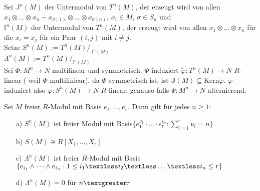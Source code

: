  \begin{Bew}
  Sei $\mathbb{J}^n(M)$ der Untermodul von $T^n(M)$, der erzeugt wird von allen 
  \\$x_1 \otimes \dots \otimes x_n -x_{\sigma(1)} \otimes \dots \otimes x_{\sigma(n)}$, $x_i \in M$, $ \sigma \in S_n$ und \\
  $\mathbb{I}^n(M)$ der Untermodul von $T^n(M)$, der erzeugt wird von allen
  $x_1 \otimes \dots \otimes x_n$ für die $x_i = x_j$ für ein Paar $(i,j)$ mit $i \neq j$.\\
  Setze $S^n(M) := T^n(M) /_{\mathbb{J}^n(M)}$\\
  $\Lambda^n(M) := T^n(M) /_{\mathbb{I}^n(M)}$ \\
  Sei $\Phi: M^n \rightarrow N$ multilinear und symmetrisch. $\Phi$ induziert 
  $\tilde{\varphi}:T^n(M) \rightarrow N$ $R$-linear ( weil $\Phi$ multiliniear), da $\Phi$ symmetrisch ist, ist
  $\mathbb{J}(M) \subseteq \textrm{Kern}\tilde{\varphi}$. $\tilde{\varphi}$ induziert also $\varphi:S^n(M) \rightarrow N$
  $R$-linear; genauso falls $\Psi : M^n \rightarrow N$ alternierend.
 \end{Bew}

 \begin{Prop}
  Sei $M$ freier $R$-Modul mit Basis $e_1, \dots, e_r$. Dann gilt für jedes $n \geq 1$:
  \begin{enumerate}
   \item[ a) ] $S^n(M)$ ist freier Modul mit Basis$\{e_1^{\nu_1} \cdot \dots \cdot e_r^{\nu_r}: \sum_{i=1}^{r}{\nu_i} =  n \}$
   \item[ b) ] $S(M) \cong R[X_1, \dots, X_r]$
   \item[ c) ] $\Lambda^n(M)$ ist freier $R$-Modul mit Basis \\
    $\{e_{i_1} \wedge \dots \wedge e_{i_n}: 1 \leq i_1 \textless i_2 \textless \dots \textless i_n \leq r \}$
   \item[ d) ] $\Lambda^n(M) = 0$ für $n \textgreater r$ 
  \end{enumerate}
 \end{Prop}
 
